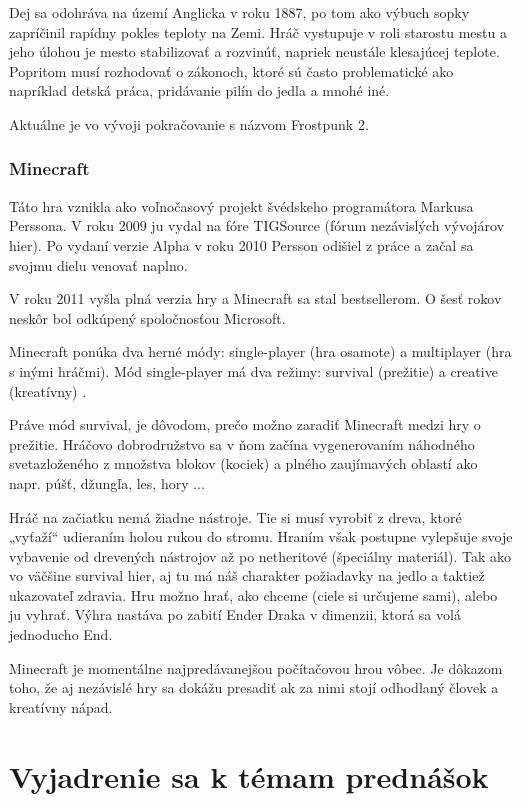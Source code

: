 \documentclass[10pt,oneoside,slovak,a4paper]{article}
\begin{document}
Dej sa odohráva na území Anglicka v roku 1887, po tom ako výbuch sopky zapríčinil rapídny pokles teploty na Zemi.
Hráč vystupuje v roli starostu mestu a jeho úlohou je mesto stabilizovať a rozvinúť, napriek neustále klesajúcej teplote. Popritom  musí rozhodovať o zákonoch, ktoré sú často problematické ako napríklad detská práca, pridávanie pilín do jedla a mnohé iné.\cite{Salo}\cite{FW}

Aktuálne je vo vývoji pokračovanie s názvom Frostpunk 2.\cite{FP2}


\subsubsection{Minecraft}
Táto hra vznikla ako voľnočasový projekt švédskeho programátora Markusa Perssona. V roku 2009 ju vydal na fóre TIGSource (fórum nezávislých vývojárov hier). Po vydaní verzie Alpha v roku 2010 Persson odišiel z práce a začal sa svojmu dielu venovať naplno.\cite{RB}

V roku 2011 vyšla plná verzia hry a Minecraft sa stal bestsellerom. O šesť rokov neskôr bol odkúpený spoločnosťou Microsoft.\cite{RB}

Minecraft ponúka dva herné módy: single-player (hra osamote) a multiplayer (hra s inými hráčmi).
Mód single-player má dva režimy: survival (prežitie) a creative (kreatívny) .

Práve mód survival, je dôvodom, prečo možno zaradiť Minecraft medzi hry o prežitie.
Hráčovo dobrodružstvo sa v ňom začína vygenerovaním náhodného sveta\cite{Duncan}zloženého z množstva blokov (kociek) a plného zaujímavých oblastí ako napr. púšť, džungľa, les, hory ...

Hráč na začiatku  nemá žiadne nástroje. Tie si musí vyrobiť z dreva, ktoré „vyťaží“ udieraním holou rukou do stromu\cite{RB}. Hraním však postupne vylepšuje svoje vybavenie od drevených nástrojov až po netheritové (špeciálny materiál). Tak ako vo väčšine survival hier, aj tu má náš charakter požiadavky na jedlo a taktiež ukazovateľ zdravia. 
Hru možno hrať, ako chceme (ciele si určujeme sami), alebo ju vyhrať. Výhra nastáva po zabití Ender Draka v dimenzii, ktorá sa volá jednoducho End.

Minecraft je momentálne najpredávanejšou počítačovou hrou vôbec\cite{Khan}.  Je dôkazom toho, že aj nezávislé hry sa dokážu presadiť ak za nimi stojí odhodlaný človek a kreatívny nápad.

\section{Vyjadrenie sa k témam prednášok} 
\end{document}
